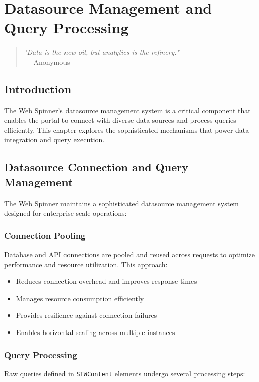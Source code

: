 \chapter{Datasource Management and Query Processing}
\label{chap:datasource-management}

\begin{quote}
\textit{"Data is the new oil, but analytics is the refinery."} \\
— Anonymous
\end{quote}

\section{Introduction}

The Web Spinner's datasource management system is a critical component that enables the portal to connect with diverse data sources and process queries efficiently. This chapter explores the sophisticated mechanisms that power data integration and query execution.

\section{Datasource Connection and Query Management}

The Web Spinner maintains a sophisticated datasource management system designed for enterprise-scale operations:

\subsection{Connection Pooling}
Database and API connections are pooled and reused across requests to optimize performance and resource utilization. This approach:
\begin{itemize}
\item Reduces connection overhead and improves response times
\item Manages resource consumption efficiently
\item Provides resilience against connection failures
\item Enables horizontal scaling across multiple instances
\end{itemize}

\subsection{Query Processing}
Raw queries defined in \texttt{STWContent} elements undergo several processing steps:

